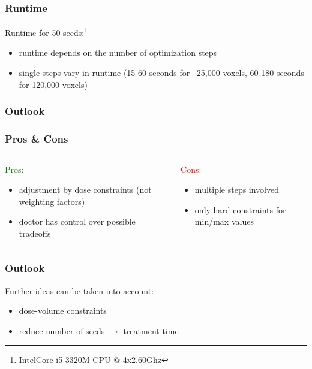 \documentclass{beamer}
\begin{document}
	\begin{frame}
	\frametitle{Runtime}
 		Runtime for 50 seeds:\footnote{Intel\textregistered  Core i5-3320M CPU @ 4x2.60Ghz}
 
		\begin{itemize}
			\item runtime depends on the number of optimization steps
			\item single steps vary in runtime (15-60 seconds for ~25,000 voxels, 60-180 seconds for 120,000 voxels)
		\end{itemize}  
	\end{frame}
	\subsubsection{Outlook}
	\begin{frame}
		\frametitle{Pros \& Cons}
		
		\begin{columns}[T] %
		\begin{column}{.48\textwidth}
		\textcolor{green}{Pros:}
		\begin{itemize}
		\item adjustment by dose constraints (not weighting factors)
		\item doctor has control over possible tradeoffs
		\end{itemize}
		
		\end{column}%
		\hfill%
		\begin{column}{.48\textwidth}
		\textcolor{red}{Cons:}
		
		\begin{itemize}
		\item multiple steps involved
		\item only hard constraints for min/max values
		\end{itemize}
		\end{column}%
		\end{columns}
	\end{frame}
	
	\begin{frame}
	\frametitle{Outlook}
		Further ideas can be taken into account:
		\begin{itemize}
			\item dose-volume constraints
			\item reduce number of seeds $\rightarrow$ treatment time
		\end{itemize}  
	\end{frame}
	
\end{document}
